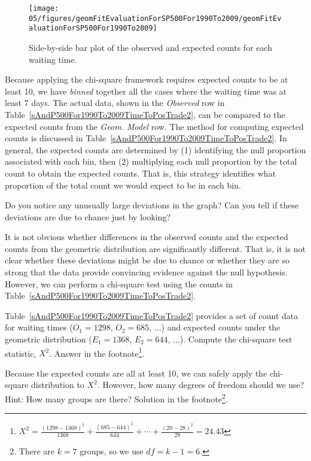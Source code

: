 \begin{figure}
\centering
\texttt{[image: 05/figures/geomFitEvaluationForSP500For1990To2009/geomFitEvaluationForSP500For1990To2009]}
\caption{Side-by-side bar plot of the observed and expected counts for each waiting time.}
\label{geomFitEvaluationForSP500For1990To2009}
\end{figure}

Because applying the chi-square framework requires expected counts to be at least 10, we have \emph{binned} together all the cases where the waiting time was at least 7 days. The actual data, shown in the \emph{Observed} row in Table~\ref{sAndP500For1990To2009TimeToPosTrade2}, can be compared to the expected counts from the \emph{Geom. Model} row. The method for computing expected counts is discussed in Table~\ref{sAndP500For1990To2009TimeToPosTrade2}. In general, the expected counts are determined by (1) identifying the null proportion associated with each bin, then (2) multiplying each null proportion by the total count to obtain the expected counts. That is, this strategy identifies what proportion of the total count we would expect to be in each bin.

\begin{exercise}
Do you notice any unusually large deviations in the graph? Can you tell if these deviations are due to chance just by looking?
\end{exercise}

It is not obvious whether differences in the observed counts and the expected counts from the geometric distribution are significantly different. That is, it is not clear whether these deviations might be due to chance or whether they are so strong that the data provide convincing evidence against the null hypothesis. However, we can perform a chi-square test using the counts in Table~\ref{sAndP500For1990To2009TimeToPosTrade2}.

\begin{exercise}
Table~\ref{sAndP500For1990To2009TimeToPosTrade2} provides a set of count data for waiting times ($O_1=1298$, $O_2=685$, ...) and expected counts under the geometric distribution ($E_1=1368$, $E_2=644$, ...). Compute the chi-square test statistic, $X^2$. Answer in the footnote\footnote{$X^2=\frac{(1298-1368)^2}{1368} + \frac{(685-644)^2}{644} + \cdots + \frac{(20-28)^2}{28} = 24.43$}.
\end{exercise}

\begin{exercise}
Because the expected counts are all at least 10, we can safely apply the chi-square distribution to $X^2$. However, how many degrees of freedom should we use? Hint: How many groups are there? Solution in the footnote\footnote{There are $k=7$ groups, so we use $df=k-1=6$.}.
\end{exercise}

